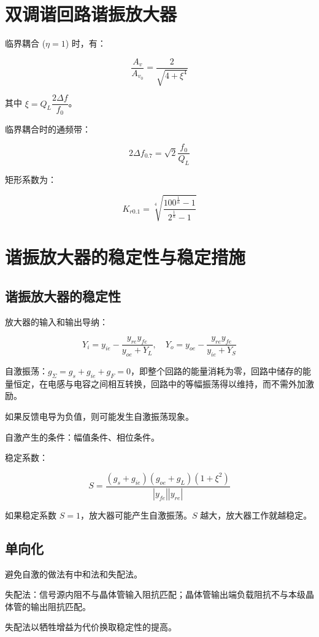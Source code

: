 \section{双调谐回路谐振放大器}

临界耦合 ($\eta = 1$) 时，有：

\begin{equation}
    \frac{A_v}{A_{v_0}} = \frac{2}{\sqrt{4 + \xi^4}}
\end{equation}

其中 $\xi = Q_L \dfrac{2 \Delta f}{f_0}$。

临界耦合时的通频带：

\begin{equation}
    2 \Delta f_{0.7} = \sqrt{2} \frac{f_0}{Q_L}
\end{equation}

矩形系数为：

\begin{equation}
    K_{r0.1} = \sqrt[4]{\frac{100^{\frac{1}{n}} - 1}{2^{\frac{1}{n}} - 1}}
\end{equation}

\section{谐振放大器的稳定性与稳定措施}

\subsection{谐振放大器的稳定性}

放大器的输入和输出导纳：

\begin{equation}
    Y_i = y_{ie} - \frac{y_{re}y_{fe}}{y_{oe} + Y_L}, \quad 
    Y_o = y_{oe} - \frac{y_{re}y_{fe}}{y_{ie} + Y_S}
\end{equation}

自激振荡：$g_{\Sigma} = g_s+ g_{ie} + g_F = 0$，即整个回路的能量消耗为零，回路中储存的能量恒定，在电感与电容之间相互转换，回路中的等幅振荡得以维持，而不需外加激励。

如果反馈电导为负值，则可能发生自激振荡现象。

自激产生的条件：幅值条件、相位条件。

稳定系数：

\begin{equation}
    S = \frac{(g_s + g_{ie})(g_{oe} + g_L)(1 + \xi^2)}{|y_{fe}||y_{re}|}
\end{equation}

如果稳定系数 $S = 1$，放大器可能产生自激振荡。$S$ 越大，放大器工作就越稳定。

\subsection{单向化}

避免自激的做法有中和法和失配法。

失配法：信号源内阻不与晶体管输入阻抗匹配；晶体管输出端负载阻抗不与本级晶体管的输出阻抗匹配。

失配法以牺牲增益为代价换取稳定性的提高。

